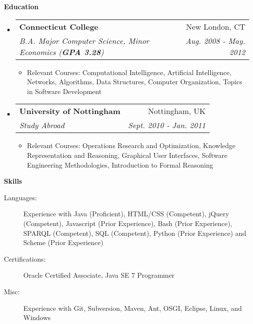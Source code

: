 \documentclass[letterpaper,11pt]{article}
\makeatletter
\newcommand{\resitem}[1]{\item #1 \vspace{-2pt}}
\newcommand{\resheading}[1]{{\large \colorbox{mygrey}{\begin{minipage}{\textwidth}{\textbf{#1 \vphantom{p\^{E}}}}\end{minipage}}}}
\newcommand{\ressubheading}[4]{
\begin{tabular*}{7.0in}{l@{\extracolsep{\fill}}r}
		\textbf{#1} & #2 \\
		\textit{#3} & \textit{#4} \\
\end{tabular*}\vspace{-6pt}}
\makeatother
\begin{document}
\resheading{Education}
\begin{itemize}
	\item
	\ressubheading{Connecticut College}{New London, CT}{B.A. Major Computer Science, Minor Economics (\textbf{GPA 3.28})}{Aug. 2008 - May. 2012}
	\begin{itemize}
		\resitem{Relevant Courses: Computational Intelligence, Artificial Intelligence, Networks, Algorithms, Data Structures, Computer Organization, Topics in Software Development}
	\end{itemize}
	
	\item
	\ressubheading{University of Nottingham}{Nottingham, UK}{Study Abroad}{Sept. 2010 - Jan. 2011}
	\begin{itemize}
		\resitem{Relevant Courses: Operations Research and Optimization, Knowledge Representation and Reasoning, Graphical User Interfaces, Software Engineering Methodologies, Introduction to Formal Reasoning}
	\end{itemize}
\end{itemize}

\resheading{Skills}
\begin{description}
	\item[Languages:]
		Experience with Java (Proficient), HTML/CSS (Competent), jQuery (Competent), Javascript (Prior Experience), Bash (Prior Experience), SPARQL (Competent), SQL (Competent), Python (Prior Experience) and Scheme (Prior Experience)
	\item[Certifications:]
		Oracle Certified Associate, Java SE 7 Programmer
	\item[Misc:]
		Experience with Git, Subversion, Maven, Ant, OSGI, Eclipse, Linux, and Windows
\end{description}
\end{document}
